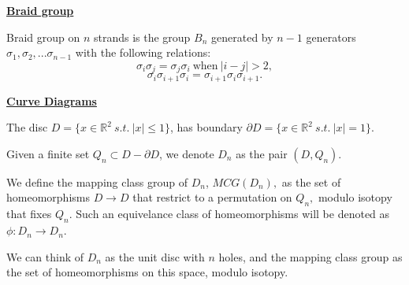 \documentclass[12pt,a4paper]{article}
\begin{document}
\maketitle

\def\Complex {C}
\def\tensor{\otimes}
\def\Tensor{\bigotimes}
\def\bra #1{\langle #1|}
\def\ket #1{|#1\rangle}
\def\braket #1#2{\langle #1|#2 \rangle}



\def\mathZ{\mathbb{Z}}
\def\mathR{\mathbb{R}}


\def\heading #1{\vskip 20pt \noindent\underline{\large \bf #1}\vskip 5pt}

\def\important #1{\underline{\bf #1}}

%

\heading{Braid group}

Braid group on $n$ strands is the group $B_n$ generated by $n-1$ generators
$\sigma_1, \sigma_2, ... \sigma_{n-1}$ with the following relations:
    $$ \sigma_i \sigma_j = \sigma_j \sigma_i \ \text{when}\ |i-j| > 2, $$
    $$ \sigma_i \sigma_{i+1} \sigma_i =  \sigma_{i+1} \sigma_i \sigma_{i+1}.$$



\heading{Curve Diagrams}

The disc $D = \{ x\in \mathR^2\ s.t.\ |x|\leq 1 \} $,
has boundary $\partial D = \{ x\in \mathR^2\ s.t.\ |x|=1 \} $.

Given a finite set $ Q_n \subset D-\partial D$,
we denote $D_n$ as the pair $(D, Q_n).$

We define the mapping class group of $D_n$,
$MCG(D_n),$ as the set of homeomorphisms $D\to D$ that
restrict to a permutation on $Q_n,$ modulo isotopy that
fixes $Q_n.$
Such an equivelance class
of homeomorphisms will be denoted as $\phi:D_n\to D_n.$

We can think of $D_n$ as the unit disc with $n$ holes,
and the mapping class group as the set of homeomorphisms on
this space, modulo isotopy.
\end{document}
